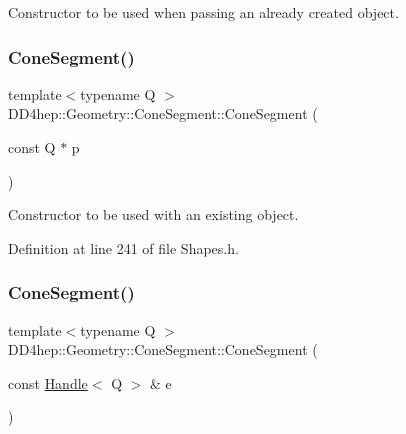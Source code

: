 Constructor to be used when passing an already created object. 

\hypertarget{class_d_d4hep_1_1_geometry_1_1_cone_segment_a5c757015086f6e110bb9e36a8a274e21}{}\label{class_d_d4hep_1_1_geometry_1_1_cone_segment_a5c757015086f6e110bb9e36a8a274e21} 
\subsubsection{\texorpdfstring{Cone\+Segment()}{ConeSegment()}\hspace{0.1cm}{\footnotesize\ttfamily [3/5]}}
{\footnotesize\ttfamily template$<$typename Q $>$ \\
D\+D4hep\+::\+Geometry\+::\+Cone\+Segment\+::\+Cone\+Segment (\begin{DoxyParamCaption}\item[{const Q $\ast$}]{p }\end{DoxyParamCaption})\hspace{0.3cm}{\ttfamily [inline]}}



Constructor to be used with an existing object. 



Definition at line 241 of file Shapes.\+h.

\hypertarget{class_d_d4hep_1_1_geometry_1_1_cone_segment_acc8610e3b6387836aafe0cf6093cbf50}{}\label{class_d_d4hep_1_1_geometry_1_1_cone_segment_acc8610e3b6387836aafe0cf6093cbf50} 
\subsubsection{\texorpdfstring{Cone\+Segment()}{ConeSegment()}\hspace{0.1cm}{\footnotesize\ttfamily [4/5]}}
{\footnotesize\ttfamily template$<$typename Q $>$ \\
D\+D4hep\+::\+Geometry\+::\+Cone\+Segment\+::\+Cone\+Segment (\begin{DoxyParamCaption}\item[{const \hyperlink{class_d_d4hep_1_1_handle}{Handle}$<$ Q $>$ \&}]{e }\end{DoxyParamCaption})\hspace{0.3cm}{\ttfamily [inline]}}



